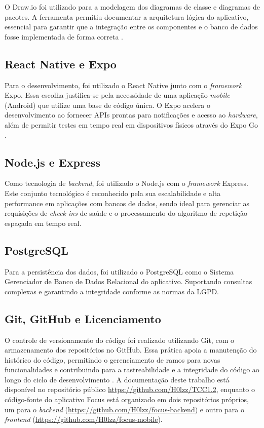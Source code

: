 O Draw.io foi utilizado para a modelagem dos diagramas de classe e diagramas de pacotes.
A ferramenta permitiu documentar a arquitetura lógica do aplicativo, essencial para garantir que a integração entre os componentes e o banco de dados fosse implementada de forma correta \cite{drawio_2025}.

\subsection{React Native e Expo}

Para o desenvolvimento, foi utilizado o React Native junto com o \textit{framework} Expo.
Essa escolha justifica-se pela necessidade de uma aplicação \textit{mobile} (Android) que utilize uma base de código única.
O Expo acelera o desenvolvimento ao fornecer APIs prontas para notificações e acesso ao \textit{hardware}, além de permitir testes em tempo real em dispositivos físicos através do Expo Go \cite{expo_2025}.

\subsection{Node.js e Express}

Como tecnologia de \textit{backend}, foi utilizado o Node.js com o \textit{framework} Express.
Este conjunto tecnológico é reconhecido pela sua escalabilidade e alta performance em aplicações com bancos de dados, sendo ideal para gerenciar as requisições de \textit{check-ins} de saúde e o processamento do algoritmo de repetição espaçada em tempo real.

\subsection{PostgreSQL}

Para a persistência dos dados, foi utilizado o PostgreSQL como o Sistema Gerenciador de Banco de Dados Relacional do aplicativo.
Suportando consultas complexas e garantindo a integridade conforme as normas da LGPD.

\subsection{Git, GitHub e Licenciamento}

O controle de versionamento do código foi realizado utilizando Git, com o armazenamento dos repositórios no GitHub.
Essa prática apoia a manutenção do histórico do código, permitindo o gerenciamento de ramos para novas funcionalidades e contribuindo para a rastreabilidade e a integridade do código ao longo do ciclo de desenvolvimento \cite{github_2025}.
A documentação deste trabalho está disponível no repositório público \url{https://github.com/H0lzz/TCC1.2}, enquanto o código-fonte do aplicativo Focus está organizado em dois repositórios próprios, um para o \textit{backend} (\url{https://github.com/H0lzz/focus-backend}) e outro para o \textit{frontend} (\url{https://github.com/H0lzz/focus-mobile}).

